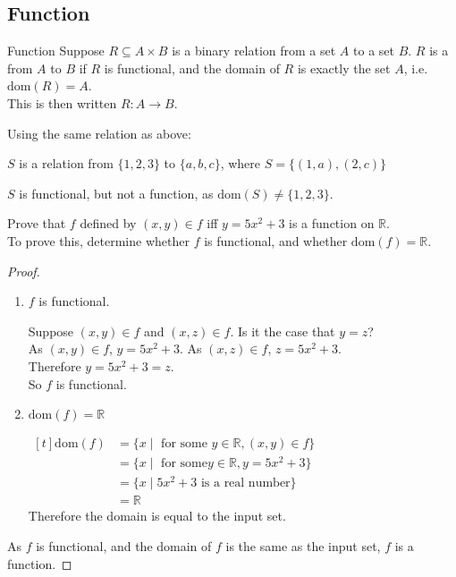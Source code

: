 \documentclass[../notes.tex]{subfiles}
\begin{document}
			\subsection{Function}
				\begin{definition}{Function}
					Suppose $R \subseteq A \times B$ is a binary relation from a set $A$ to a set $B$. $R$ is a  from $A$ to $B$ if $R$ is functional, and the domain of $R$ is exactly the set $A$, i.e. $\mathrm{dom}(R) = A$.\\
					This is then written $R: A \rightarrow B$.
				\end{definition}
				\begin{example}
					Using the same relation as above:
						\begin{indentparagraph}
							$S$ is a relation from $\{1, 2, 3\}$ to $\{a, b, c\}$, where $S = \bigl\{(1, a), (2, c)\bigr\}$
						\end{indentparagraph}
						$S$ is functional, but not a function, as $\mathrm{dom}(S) \neq \{1, 2, 3\}$.
				\end{example}
				\begin{example}
					Prove that $f$ defined by $(x, y) \in f$ iff $y = 5x^{2} + 3$ is a function on $\mathbb{R}$.\\
					To prove this, determine whether $f$ is functional, and whether $\mathrm{dom}(f) = \mathbb{R}$.
					\begin{proof}
						$ $
						\begin{enumerate}[label=(\roman*)]
							\item $f$ is functional.
								\begin{subproof}
									Suppose $(x, y) \in f$ and $(x, z) \in f$. Is it the case that $y = z$?\\
									As $(x, y) \in f$, $y = 5x^{2} + 3$. As $(x, z) \in f$, $z = 5x^{2} + 3$.\\
									Therefore $y = 5x^{2} + 3 = z$.\\
									So $f$ is functional. 
								\end{subproof}
							\item $\mathrm{dom}(f) = \mathbb{R}$
								\begin{subproof} $
									\begin{aligned}[t]
										\mathrm{dom}(f) &= \{x \mid \text{ for some } y \in \mathbb{R}, (x, y) \in f\}\\
										&= \{x \mid \text{ for some} y \in \mathbb{R}, y = 5x^{2} + 3\}\\
										&= \{x \mid 5x^{2} + 3 \text{ is a real number}\}\\
										&= \mathbb{R}
									\end{aligned} $\\
									Therefore the domain is equal to the input set.
								\end{subproof}
						\end{enumerate}
						As $f$ is functional, and the domain of $f$ is the same as the input set, $f$ is a function.
					\end{proof}
				\end{example}
\end{document}
